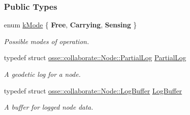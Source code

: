 \subsubsection*{Public Types}
\begin{DoxyCompactItemize}
\item 
\mbox{\label{classosse_1_1collaborate_1_1_node_a6f8b0270e42a0c2059d7b554acfbd3db}} 
enum \hyperlink{classosse_1_1collaborate_1_1_node_a6f8b0270e42a0c2059d7b554acfbd3db}{k\+Mode} \{ {\bfseries Free}, 
{\bfseries Carrying}, 
{\bfseries Sensing}
 \}\begin{DoxyCompactList}\small\item\em Possible modes of operation. \end{DoxyCompactList}
\item 
\mbox{\label{classosse_1_1collaborate_1_1_node_acfeda3c545f3705daed42fb0f3aefd0a}} 
typedef struct \hyperlink{structosse_1_1collaborate_1_1_node_1_1_partial_log}{osse\+::collaborate\+::\+Node\+::\+Partial\+Log} \hyperlink{classosse_1_1collaborate_1_1_node_acfeda3c545f3705daed42fb0f3aefd0a}{Partial\+Log}
\begin{DoxyCompactList}\small\item\em A geodetic log for a node. \end{DoxyCompactList}\item 
\mbox{\label{classosse_1_1collaborate_1_1_node_ad0600514a3ee62f8b415cd0f1a1ca846}} 
typedef struct \hyperlink{structosse_1_1collaborate_1_1_node_1_1_log_buffer}{osse\+::collaborate\+::\+Node\+::\+Log\+Buffer} \hyperlink{classosse_1_1collaborate_1_1_node_ad0600514a3ee62f8b415cd0f1a1ca846}{Log\+Buffer}
\begin{DoxyCompactList}\small\item\em A buffer for logged node data. \end{DoxyCompactList}\end{DoxyCompactItemize}
